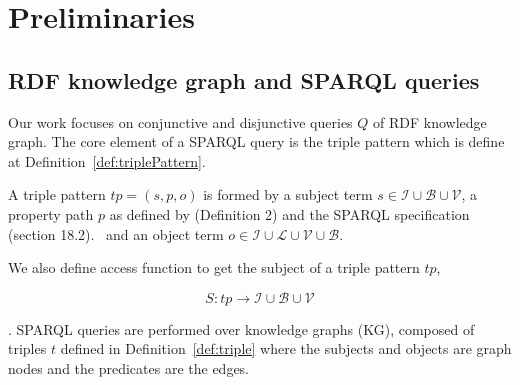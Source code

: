 \section{Preliminaries}






\subsection{RDF knowledge graph and SPARQL queries}
Our work focuses on conjunctive and disjunctive queries $Q$ of RDF knowledge graph.
The core element of a SPARQL query is the triple pattern which is define at Definition~\ref{def:triplePattern}.

\begin{definition}\label{def:triplePattern}
    A triple pattern $tp = (s, p , o)$ is formed by a subject term $s \in \mathcal{I} \cup \mathcal{B} \cup \mathcal{V}$, 
    a property path  $p$ as defined by  \citeauthor{Kostylev2015} (Definition 2) and the SPARQL specification (section 18.2).~ 
    and an object term  $o \in \mathcal{I} \cup \mathcal{L} \cup \mathcal{V} \cup \mathcal{B}$.
\end{definition}

We also define access function to get the subject of a triple pattern $tp$, 

\begin{equation}
    S: tp \rightarrow \mathcal{I} \cup \mathcal{B} \cup \mathcal{V}
\end{equation}

.
SPARQL queries are performed over knowledge graphs (KG), composed of triples $t$ defined in Definition~\ref{def:triple} where the subjects and objects are graph nodes and the predicates are the edges.


